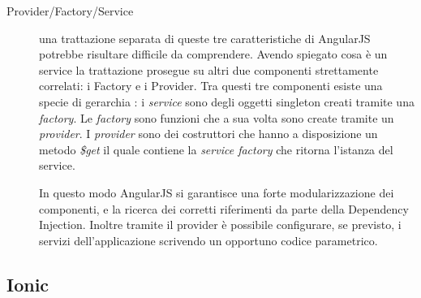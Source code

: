 \begin{description}
\item[Provider/Factory/Service] una trattazione separata di queste tre caratteristiche di AngularJS potrebbe risultare difficile da comprendere. Avendo spiegato cosa è un service la trattazione prosegue su altri due componenti strettamente correlati: i Factory e i Provider.
Tra questi tre componenti esiste una specie di gerarchia : i \textit{service} sono degli oggetti singleton creati tramite una \textit{factory}. Le \textit{factory} sono funzioni che a sua volta sono create tramite un \textit{provider}. I \textit{provider} sono dei costruttori che hanno a disposizione un metodo \emph{\$get} il quale contiene la \emph{service factory} che ritorna l'istanza del service.

In questo modo AngularJS si garantisce una forte modularizzazione dei componenti, e la ricerca dei corretti riferimenti da parte della Dependency Injection. Inoltre tramite il provider è possibile configurare, se previsto, i servizi dell'applicazione scrivendo un opportuno codice parametrico.

\end{description} 


\subsection{Ionic}

